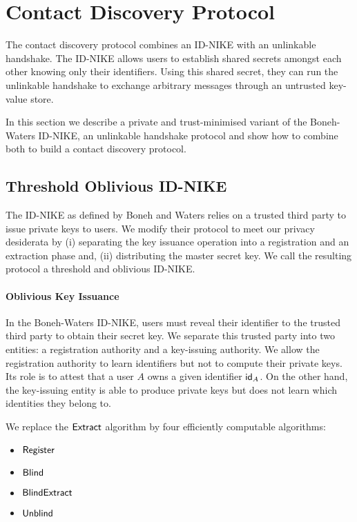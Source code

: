 \section{Contact Discovery Protocol}
\label{sec:contact_discovery_protocol}

The \sysname contact discovery protocol combines an ID-NIKE with an unlinkable handshake. 
The ID-NIKE allows users to establish shared secrets amongst each other knowing only their identifiers. 
Using this shared secret, they can run the unlinkable handshake to exchange arbitrary messages through an untrusted key-value store. 

In this section we describe a private and trust-minimised variant of the Boneh-Waters ID-NIKE, an unlinkable handshake protocol and show how to combine both to build a contact discovery protocol.

	\subsection{Threshold Oblivious ID-NIKE}
	
	The ID-NIKE as defined by Boneh and Waters \cite{boneh2013constrained} relies on a trusted third party to issue private keys to users.
	We modify their protocol to meet our privacy desiderata by (i) separating the key issuance operation into a registration and an extraction phase and, (ii) distributing the master secret key.  
	We call the resulting protocol a threshold and oblivious ID-NIKE.
	
	\paragraph{Oblivious Key Issuance} In the Boneh-Waters ID-NIKE, users must reveal their identifier to the trusted third party to obtain their secret key. 
	We separate this trusted party into two entities: a registration authority and a key-issuing authority. 
	We allow the registration authority to learn identifiers but not to compute their private keys. 
	Its role is to attest that a user $A$ owns a given identifier $\mathsf{id}_A$.
	On the other hand, the key-issuing entity is able to produce private keys but does not learn which identities they belong to.
	
	We replace the $\mathsf{Extract}$ algorithm by four efficiently computable algorithms:
	\begin{itemize}
		\item $\mathsf{Register}$
		\item $\mathsf{Blind}$
		\item $\mathsf{BlindExtract}$
		\item $\mathsf{Unblind}$
	\end{itemize}
	
